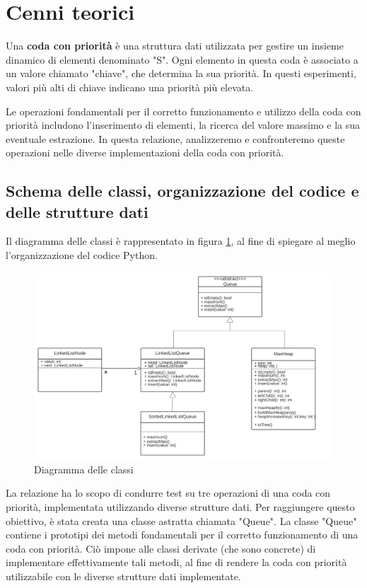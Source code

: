 \documentclass{article}
\begin{document}
\label{sec:usoLibrerie}

\clearpage

\section{Cenni teorici}
Una \textbf{coda con priorità} è una struttura dati utilizzata per gestire un insieme dinamico di elementi denominato "S". Ogni elemento in questa coda è associato a un valore chiamato "chiave", che determina la sua priorità. In questi esperimenti, valori più alti di chiave indicano una priorità più elevata.

Le operazioni fondamentali per il corretto funzionamento e utilizzo della coda con priorità includono l'inserimento di elementi, la ricerca del valore massimo e la sua eventuale estrazione. In questa relazione, analizzeremo e confronteremo queste operazioni nelle diverse implementazioni della coda con priorità.

\subsection{Schema delle classi, organizzazione del codice e delle strutture dati}
Il diagramma delle classi è rappresentato in figura \ref{fig: DiagrammaDelleClassi}, al fine di spiegare al meglio l'organizzazione del codice Python. 

\begin{figure}[h]
    \includegraphics[width=1\textwidth]{Images/DiagrammaDelleClassi.png}
    \centering
    \caption{Diagramma delle classi}
    \label{fig: DiagrammaDelleClassi}
\end{figure}

La relazione ha lo scopo di condurre test su tre operazioni di una coda con priorità, implementata utilizzando diverse strutture dati. Per raggiungere questo obiettivo, è stata creata una classe astratta chiamata "Queue". La classe "Queue" contiene i prototipi dei metodi fondamentali per il corretto funzionamento di una coda con priorità. Ciò impone alle classi derivate (che sono concrete) di implementare effettivamente tali metodi, al fine di rendere la coda con priorità utilizzabile con le diverse strutture dati implementate.
\end{document}
